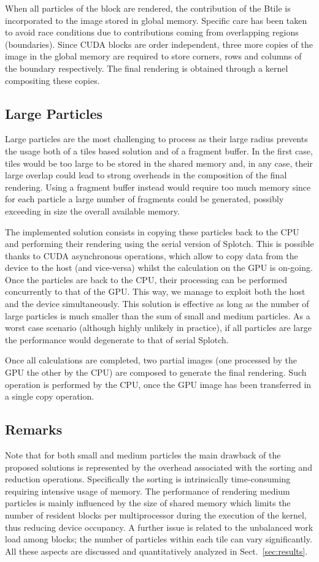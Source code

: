 \documentclass[smallextended]{svjour3}
\begin{document}
When all particles of the block are rendered, the contribution of the Btile is incorporated to the image stored in global memory. Specific care has been taken to avoid race conditions due to contributions coming
from overlapping regions (boundaries). Since CUDA blocks are order independent, three more copies of the image in the global memory are required to store corners, rows and columns of the boundary respectively. The final rendering is obtained through a kernel compositing these copies.  

\subsection{Large Particles}
\label{sec:largeparticles}
Large particles are the most challenging to process as their large
radius prevents the usage both of a tiles based solution and of a fragment buffer.
In the first case, tiles would be too large to be stored in the shared memory
and, in any case, their large overlap could lead to strong overheads in the composition of the
final rendering. Using a fragment buffer instead would require too much memory since
for each particle a large number of fragments could be generated, possibly
exceeding in size the overall available memory.

The implemented solution consists in copying these particles back to the CPU and performing their rendering
using the serial version of Splotch. This is possible thanks to CUDA asynchronous
operations, which allow to copy data from the device to the host (and vice-versa)
whilst the calculation on the GPU is on-going. Once the particles are back to the CPU,
their processing can be performed concurrently to that of the GPU.  
This way, we manage to exploit both the host and the device simultaneously.
This solution is effective as long as the number of large particles
is much smaller than the sum of small and medium particles. As a worst case scenario (although highly unlikely in practice), if all particles are large the performance would degenerate to that of serial Splotch.

Once all calculations are completed, two partial images (one processed by the GPU the other by the CPU) are composed to generate the final rendering. Such operation is performed by the CPU, once the GPU image has been transferred in a single copy operation. 

\subsection{Remarks}
Note that for both small and medium particles the main drawback of the proposed solutions
is represented by the overhead associated with the sorting and reduction operations. Specifically the sorting is intrinsically time-consuming requiring intensive usage of memory.
The performance of rendering medium particles is mainly influenced
by the size of shared memory which limits the number of resident blocks
per multiprocessor during the execution of the kernel, thus reducing device occupancy. 
A further issue is related to the unbalanced work load among blocks; the number of particles within each tile can vary significantly. All these aspects are discussed and quantitatively analyzed in Sect.~\ref{sec:results}.
\end{document}

